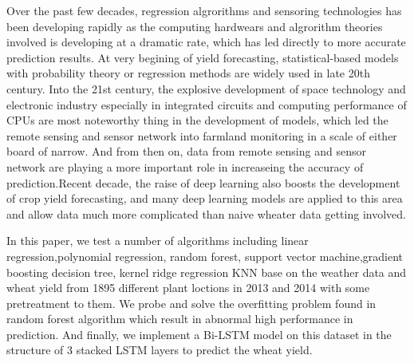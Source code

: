 \documentclass[conference]{IEEEtran}
\begin{document}
  Over the past few decades, regression algrorithms and sensoring technologies has been developing rapidly as the computing hardwears and algrorithm theories involved is developing at a dramatic rate, which has led directly to more accurate prediction results. At very begining of yield forecasting, statistical-based models with probability theory or regression methods are widely used in late 20th century\cite{Matis1985, stephens1995crop}. Into the 21st century, the explosive development of space technology and electronic industry especially in integrated circuits and computing performance of CPUs are most noteworthy thing in the development of models, which led the remote sensing and sensor network into farmland monitoring in a scale of either board of narrow. And from then on, data from remote sensing and sensor network are playing a more important role in increaseing the accuracy of prediction\cite{You2017,Baruth}.Recent decade, the raise of deep learning also boosts the development of crop yield forecasting, and many deep learning models are applied to this area and allow data much more complicated than naive wheater data getting involved.
  
  


  In this paper, we test a number of algorithms including linear regression,polynomial regression, random forest, support vector machine,gradient boosting decision tree, kernel ridge regression KNN base on the weather data and wheat yield from 1895 different plant loctions in 2013 and 2014 with some pretreatment to them. We probe and solve the overfitting problem found in random forest algorithm which result in abnormal high performance in prediction. And finally, we implement a Bi-LSTM model on this dataset in the structure of 3 stacked LSTM layers to predict the wheat yield.
\end{document}
